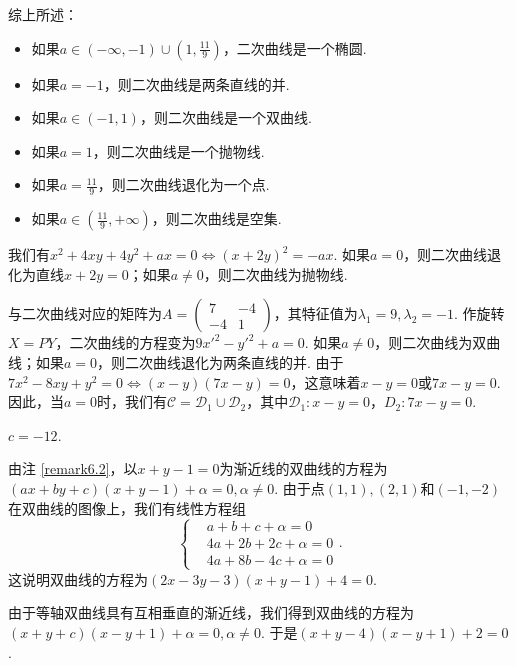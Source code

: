 \begin{solution}
  综上所述：
  \begin{itemize}
    \item 如果$a\in(-\infty,-1)\cup\left(1,\frac{11}9\right)$，二次曲线是一个椭圆.
    \item 如果$a=-1$，则二次曲线是两条直线的并.
    \item 如果$a\in(-1,1)$，则二次曲线是一个双曲线.
    \item 如果$a=1$，则二次曲线是一个抛物线.
    \item 如果$a=\frac{11}9$，则二次曲线退化为一个点.
    \item 如果$a\in\left(\frac{11}9,+\infty\right)$，则二次曲线是空集.
  \end{itemize}

  \begin{inparaenum}[(1)]\setcounter{enumi}{2}
    \item 我们有$x^2+4xy+4y^2+ax=0\Leftrightarrow (x+2y)^2=-ax$. 如果$a=0$，则二次曲线退化为直线$x+2y=0$；如果$a\ne0$，则二次曲线为抛物线.

    \item 与二次曲线对应的矩阵为$A=\begin{pmatrix}
      7 & -4 \\
      -4 & 1
    \end{pmatrix}$，其特征值为$\lambda_1=9,\lambda_2=-1$. 作旋转$X=PY$，二次曲线的方程变为$9x'^2-y'^2+a=0$. 如果$a\ne0$，则二次曲线为双曲线；如果$a=0$，则二次曲线退化为两条直线的并. 由于$7x^2-8xy+y^2=0\Leftrightarrow (x-y)(7x-y)=0$，这意味着$x-y=0$或$7x-y=0$. 因此，当$a=0$时，我们有$\mathscr C=\mathscr D_1\cup\mathscr D_2$，其中$\mathscr D_1:x-y=0$，$D_2:7x-y=0$.
  \end{inparaenum}
\end{solution}

\begin{solution}
  $c=-12$.
\end{solution}

\setcounter{solution}{4}

\begin{solution}
  \begin{inparaenum}[(a)]
    \item 由注 \ref{remark6.2}，以$x+y-1=0$为渐近线的双曲线的方程为$(ax+by+c)(x+y-1)+\alpha=0,\alpha\ne0$. 由于点$(1,1),(2,1)$和$(-1,-2)$在双曲线的图像上，我们有线性方程组
        \[
          \left\{
            \begin{aligned}
              & a + b + c + \alpha = 0 \\
              & 4a + 2b + 2c + \alpha = 0 \\
              & 4a + 8b - 4c + \alpha = 0
            \end{aligned}
          \right..
        \]
        这说明双曲线的方程为$(2x-3y-3)(x+y-1)+4=0$.

    \item 由于等轴双曲线具有互相垂直的渐近线，我们得到双曲线的方程为$(x+y+c)(x-y+1)+\alpha=0,\alpha\ne0$. 于是$(x+y-4)(x-y+1)+2=0$.
  \end{inparaenum}
\end{solution}

